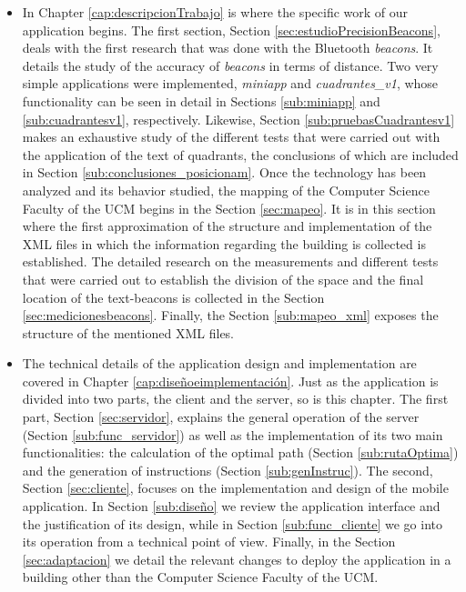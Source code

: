 \begin{itemize}
	\item In Chapter \ref{cap:descripcionTrabajo} is where the specific work of our application begins. The first section, Section \ref{sec:estudioPrecisionBeacons}, deals with the first research that was done with the Bluetooth \textit{beacons}. It details the study of the accuracy of \textit{beacons} in terms of distance. Two very simple applications were implemented, \textit{miniapp} and \textit{cuadrantes\_v1}, whose functionality can be seen in detail in Sections \ref{sub:miniapp} and \ref{sub:cuadrantesv1}, respectively. Likewise, Section \ref{sub:pruebasCuadrantesv1} makes an exhaustive study of the different tests that were carried out with the application of the text of quadrants, the conclusions of which are included in Section \ref{sub:conclusiones_posicionam}. Once the technology has been analyzed and its behavior studied, the mapping of the Computer Science Faculty of the UCM begins in the Section \ref{sec:mapeo}. It is in this section where the first approximation of the structure and implementation of the XML files in which the information regarding the building is collected is established. The detailed research on the measurements and different tests that were carried out to establish the division of the space and the final location of the text-beacons is collected in the Section \ref{sec:medicionesbeacons}. Finally, the Section \ref{sub:mapeo_xml} exposes the structure of the mentioned XML files.
	
	\item The technical details of the application design and implementation are covered in Chapter \ref{cap:diseñoeimplementación}. Just as the application is divided into two parts, the client and the server, so is this chapter. The first part, Section \ref{sec:servidor}, explains the general operation of the server (Section \ref{sub:func_servidor}) as well as the implementation of its two main functionalities: the calculation of the optimal path (Section \ref{sub:rutaOptima}) and the generation of instructions (Section \ref{sub:genInstruc}). The second, Section \ref{sec:cliente}, focuses on the implementation and design of the mobile application. In Section \ref{sub:diseño} we review the application interface and the justification of its design, while in Section \ref{sub:func_cliente} we go into its operation from a technical point of view. Finally, in the Section \ref{sec:adaptacion} we detail the relevant changes to deploy the application in a building other than the Computer Science Faculty of the UCM.
	

\end{itemize}
